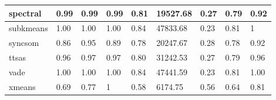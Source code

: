 \begin{table}[H]
\begin{tabular}{|l|l|l|l|l|l|l|l|l|}
\hline
spectral & 0.99 & 0.99 & 0.99 & 0.81 & 19527.68 & 0.27 & 0.79 & 0.92 \\
\hline
subkmeans & 1.00 & 1.00 & 1.00 & 0.84 & 47833.68 & 0.23 & 0.81 & 1 \\
\hline
syncsom & 0.86 & 0.95 & 0.89 & 0.78 & 20247.67 & 0.28 & 0.78 & 0.92 \\
\hline
ttsas & 0.96 & 0.97 & 0.97 & 0.80 & 31242.53 & 0.27 & 0.79 & 0.96 \\
\hline
vade & 1.00 & 1.00 & 1.00 & 0.84 & 47441.59 & 0.23 & 0.81 & 1.00 \\
\hline
xmeans & 0.69 & 0.77 & 1 & 0.58 & 6174.75 & 0.56 & 0.64 & 0.81 \\
\hline
\end{tabular}
\end{table}